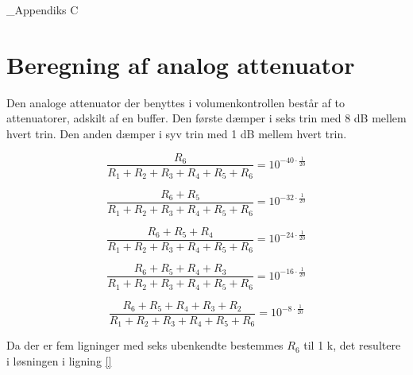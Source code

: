 \chapteR_{Appendiks C}
\label{beregning-af-analog-attenuator}
\section*{Beregning af analog attenuator}

Den analoge attenuator der benyttes i volumenkontrollen består af to attenuatorer, adskilt af en buffer. Den første dæmper i seks trin med 8 dB mellem hvert trin. Den anden dæmper i syv trin med 1 dB mellem hvert trin.

\begin{equation}
\frac{R_6}{R_1 + R_2 + R_3 + R_4 + R_5 + R_6} = 10^{-40 \cdot \frac{1}{20}}
\end{equation}

\begin{equation}
\frac{R_6 + R_5}{R_1 + R_2 + R_3 + R_4 + R_5 + R_6} = 10^{-32 \cdot \frac{1}{20}}
\end{equation}

\begin{equation}
\frac{R_6 + R_5 + R_4}{R_1 + R_2 + R_3 + R_4 + R_5 + R_6} = 10^{-24 \cdot \frac{1}{20}}
\end{equation}

\begin{equation}
\frac{R_6 + R_5 + R_4 + R_3}{R_1 + R_2 + R_3 + R_4 + R_5 + R_6} = 10^{-16 \cdot \frac{1}{20}}
\end{equation}

\begin{equation}
\frac{R_6 + R_5 + R_4 + R_3 + R_2}{R_1 + R_2 + R_3 + R_4 + R_5 + R_6} = 10^{-8 \cdot \frac{1}{20}}
\end{equation}

Da der er fem ligninger med seks ubenkendte bestemmes $R_6$ til 1 k\ohm, det resultere i løsningen i ligning \ref{}

